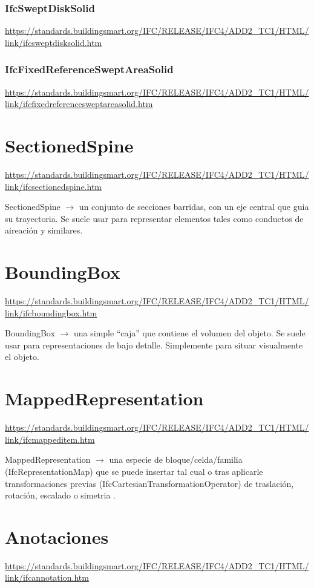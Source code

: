 \documentclass[spanish,12pt,a4paper,final,oneside]{book}
\begin{document}
\subsubsection{IfcSweptDiskSolid}
\url{https://standards.buildingsmart.org/IFC/RELEASE/IFC4/ADD2_TC1/HTML/link/ifcsweptdisksolid.htm}

\subsubsection{IfcFixedReferenceSweptAreaSolid}
\url{https://standards.buildingsmart.org/IFC/RELEASE/IFC4/ADD2_TC1/HTML/link/ifcfixedreferencesweptareasolid.htm}




\section{SectionedSpine}
\url{https://standards.buildingsmart.org/IFC/RELEASE/IFC4/ADD2_TC1/HTML/link/ifcsectionedspine.htm}

SectionedSpine $\rightarrow$ un conjunto de secciones barridas, con un eje central que guia su trayectoria. Se suele usar para representar elementos tales como conductos de aireación y similares.


\section{BoundingBox}
\url{https://standards.buildingsmart.org/IFC/RELEASE/IFC4/ADD2_TC1/HTML/link/ifcboundingbox.htm}

BoundingBox $\rightarrow$ una simple ``caja'' que contiene el volumen del objeto. Se suele usar para representaciones de bajo detalle. Simplemente para situar visualmente el objeto.


\section{MappedRepresentation}
\url{https://standards.buildingsmart.org/IFC/RELEASE/IFC4/ADD2_TC1/HTML/link/ifcmappeditem.htm}

MappedRepresentation $\rightarrow$ una especie de bloque/celda/familia (IfcRepresentationMap) que se puede insertar tal cual o tras aplicarle  transformaciones previas (IfcCartesianTransformationOperator) de traslación, rotación, escalado o simetria .


\section{Anotaciones}
\url{https://standards.buildingsmart.org/IFC/RELEASE/IFC4/ADD2_TC1/HTML/link/ifcannotation.htm}
\end{document}
